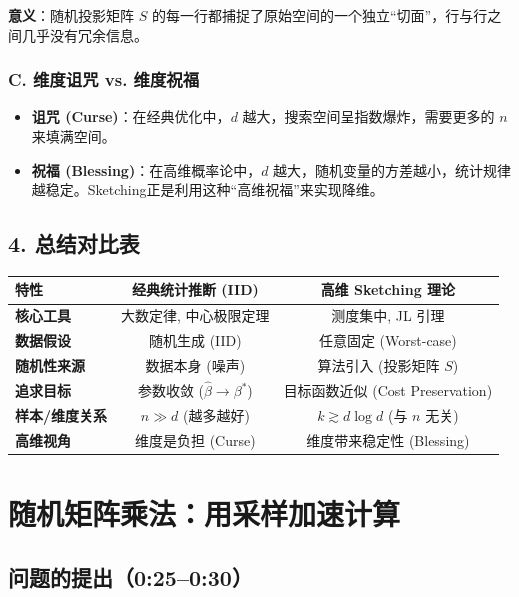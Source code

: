 \documentclass[11pt,a4paper]{ctexart}
\theoremstyle{definition}
\theoremstyle{remark}
\begin{document}
\textbf{意义}：随机投影矩阵 $S$ 的每一行都捕捉了原始空间的一个独立“切面”，行与行之间几乎没有冗余信息。

\subsubsection{C. 维度诅咒 vs. 维度祝福}
\begin{itemize}
    \item \textbf{诅咒 (Curse)}：在经典优化中，$d$ 越大，搜索空间呈指数爆炸，需要更多的 $n$ 来填满空间。
    \item \textbf{祝福 (Blessing)}：在高维概率论中，$d$ 越大，随机变量的方差越小，统计规律越稳定。Sketching正是利用这种“高维祝福”来实现降维。
\end{itemize}

\subsection{4. 总结对比表}

\begin{center}
\begin{tabular}{lcc}
\toprule
\textbf{特性} & \textbf{经典统计推断 (IID)} & \textbf{高维 Sketching 理论} \\
\midrule
\textbf{核心工具} & 大数定律, 中心极限定理 & 测度集中, JL 引理 \\
\textbf{数据假设} & 随机生成 (IID) & 任意固定 (Worst-case) \\
\textbf{随机性来源} & 数据本身 (噪声) & 算法引入 (投影矩阵 $S$) \\
\textbf{追求目标} & 参数收敛 ($\hat{\beta} \to \beta^*$) & 目标函数近似 (Cost Preservation) \\
\textbf{样本/维度关系} & $n \gg d$ (越多越好) & $k \gtrsim d \log d$ (与 $n$ 无关) \\
\textbf{高维视角} & 维度是负担 (Curse) & 维度带来稳定性 (Blessing) \\
\bottomrule
\end{tabular}
\end{center}


\section{随机矩阵乘法：用采样加速计算}

\subsection{问题的提出（0:25--0:30）}
\end{document}
